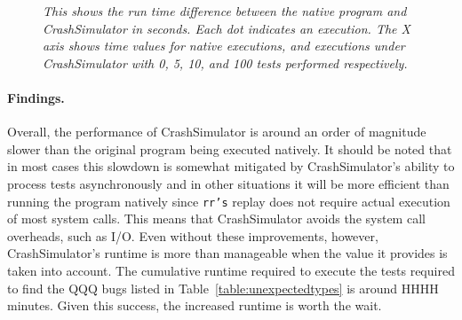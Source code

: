     \begin{figure}[t]
        \center{}
        \caption{\emph{This shows the run time difference between the
native program and CrashSimulator in seconds.  Each dot indicates an
        execution.  The X axis shows time values for native executions, and
        executions under CrashSimulator with 0, 5, 10, and 100 tests
        performed respectively.
}}
         \label{figure:performance}

    \end{figure}


\paragraph{Findings.}
Overall, the performance of CrashSimulator is around
an order of magnitude slower than the original program being executed
natively.  It should be noted that in most cases
this slowdown is somewhat mitigated by CrashSimulator's ability to process
tests asynchronously and in other situations it will be more efficient than
running the program natively since {\tt rr's} replay does not require
actual execution of most system calls.  This means that CrashSimulator
avoids the system call overheads, such as I/O.
Even without these improvements, however, CrashSimulator's runtime is more
than manageable when the value it provides is taken into account.  The
cumulative runtime required to execute the tests required to find the QQQ
bugs listed in Table~\ref{table:unexpectedtypes} is around HHHH minutes.
Given this success, the increased runtime is worth the wait.

